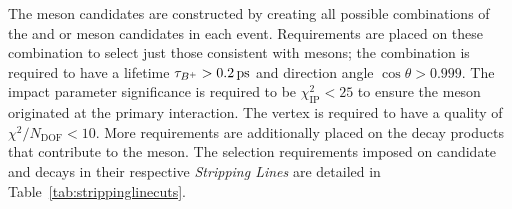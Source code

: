 The \Bp meson candidates are constructed by creating all possible combinations of the \Dsp and \phiz or \Dzb meson candidates in each event.
Requirements are placed on these combination to select just those consistent with \Bp mesons; the combination is required to have a lifetime $\tau_{{{{B}^+}}} > 0.2{\mathrm{ \,ps}}$ and direction angle $\cos{\theta}>0.999$. The impact parameter significance is required to be $\chi^{2}_{\text{IP}} < 25$ to ensure the \Bp meson originated at the primary interaction. The vertex is required to have a quality of $\chi^{2}/N_{\text{DOF}} < 10$. 
More requirements are additionally placed on the decay products that contribute to the \Bp meson. The selection requirements imposed on candidate \decay{\Bp}{\Dsp\phiz} and \decay{\Bp}{\Dsp\Kp\Km} decays in their respective \emph{Stripping Lines} are detailed in Table~\ref{tab:strippinglinecuts}. 







